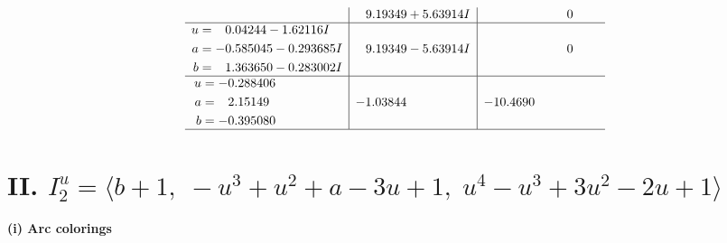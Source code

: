 \documentclass[1p]{elsarticle_modified}
\theoremstyle{definition}
\begin{document}
$$\begin{array}{c|c|c}
 & \phantom{-}9.19349 + 5.63914 I & \phantom{-0.000000 } 0 \\ \hline\begin{aligned}
u &= \phantom{-}0.04244 - 1.62116 I \\
a &= -0.585045 - 0.293685 I \\
b &= \phantom{-}1.363650 - 0.283002 I\end{aligned}
 & \phantom{-}9.19349 - 5.63914 I & \phantom{-0.000000 } 0 \\ \hline\begin{aligned}
u &= -0.288406\phantom{ +0.000000I} \\
a &= \phantom{-}2.15149\phantom{ +0.000000I} \\
b &= -0.395080\phantom{ +0.000000I}\end{aligned}
 & -1.03844\phantom{ +0.000000I} & -10.4690\phantom{ +0.000000I}\\
 \hline 
 \end{array}$$\newpage\newpage\renewcommand{\arraystretch}{1}
\centering \section*{II. $I^u_{2}= \langle b+1,\;- u^3+u^2+a-3 u+1,\;u^4- u^3+3 u^2-2 u+1 \rangle$}
\flushleft \textbf{(i) Arc colorings}\\
\end{document}
